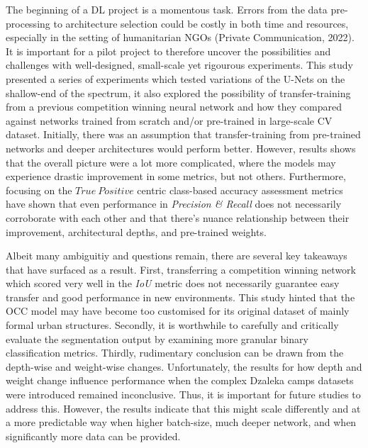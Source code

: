 \documentclass[11pt, a4paper, twoside]{report}
\begin{document}
The beginning of a DL project is a momentous task. Errors from the data pre-processing to architecture selection could be costly in both time and resources, especially in the setting of humanitarian NGOs (Private Communication, 2022). It is important for a pilot project to therefore uncover the possibilities and challenges with well-designed, small-scale yet rigourous experiments. This study presented a series of experiments which tested variations of the U-Nets on the shallow-end of the spectrum, it also explored the possibility of transfer-training from a previous competition winning neural network and how they compared against networks trained from scratch and/or pre-trained in large-scale CV dataset. Initially, there was an assumption that transfer-training from pre-trained networks and deeper architectures would perform better. However, results shows that the overall picture were a lot more complicated, where the models may experience drastic improvement in some metrics, but not others. Furthermore, focusing on the $True\ Positive$ centric class-based accuracy assessment metrics have shown that even performance in \textit{Precision \& Recall} does not necessarily corroborate with each other and that there's nuance relationship between their improvement, architectural depths, and pre-trained weights.\\\par

Albeit many ambiguitiy and questions remain, there are several key takeaways that have surfaced as a result. First, transferring a competition winning network which scored very well in the \textit{IoU} metric does not necessarily guarantee easy transfer and good performance in new environments. This study hinted that the OCC model may have become too customised for its original dataset of mainly formal urban structures. Secondly, it is worthwhile to carefully and critically evaluate the segmentation output by examining more granular binary classification metrics. Thirdly, rudimentary conclusion can be drawn from the depth-wise and weight-wise changes. Unfortunately, the results for how depth and weight change influence performance when the complex Dzaleka camps datasets were introduced remained inconclusive. Thus, it is important for future studies to address this. However, the results indicate that this might scale differently and at a more predictable way when higher batch-size, much deeper network, and when significantly more data can be provided.\\\par
\end{document}
